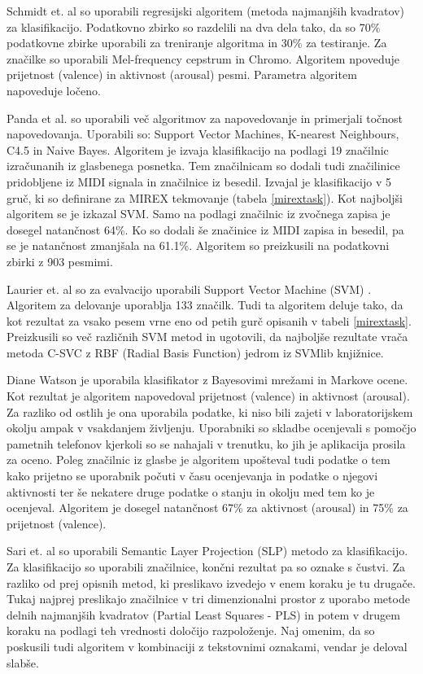 \documentclass[a4paper, 12pt]{book}
\begin{document}
{Schmidt et. al \cite{schmidt2009projection} so uporabili regresijski algoritem (metoda najmanjših kvadratov) za klasifikacijo. Podatkovno zbirko so razdelili na dva dela tako, da so 70\% podatkovne zbirke uporabili za treniranje algoritma in 30\% za testiranje. Za značilke so uporabili Mel-frequency cepstrum in Chromo. Algoritem npoveduje prijetnost (valence) in aktivnost (arousal) pesmi. Parametra algoritem napoveduje ločeno. 

Panda et al. \cite{panda2013multi} so uporabili več algoritmov za napovedovanje in primerjali točnost napovedovanja. Uporabili so: Support Vector Machines, K-nearest Neighbours, C4.5 in Naive Bayes. Algoritem je izvaja klasifikacijo na podlagi 19 značilnic izračunanih iz glasbenega posnetka. Tem značilnicam so dodali tudi značilinice pridobljene iz MIDI signala in značilnice iz besedil. Izvajal je klasifikacijo v 5 gruč, ki so definirane za MIREX tekmovanje (tabela \ref{mirextask}).  Kot najboljši algoritem se je izkazal SVM. Samo na podlagi značilnic iz zvočnega zapisa je dosegel natančnost 64\%. Ko so dodali še značinice iz MIDI zapisa in besedil, pa se je natančnost zmanjšala na 61.1\%. Algoritem so preizkusili na podatkovni zbirki z 903 pesmimi. 

Laurier et. al \cite{laurier2007audio} so za evalvacijo uporabili Support Vector Machine (SVM) \cite{ben2010user}. Algoritem za delovanje uporablja 133 značilk. Tudi ta algoritem deluje tako, da kot rezultat za vsako pesem vrne eno od petih gurč opisanih v tabeli \ref{mirextask}. Preizkusili so več različnih SVM metod in ugotovili, da najboljše rezultate vrača metoda C-SVC z RBF (Radial Basis Function) jedrom iz SVMlib knjižnice. 

Diane Watson \cite{watson2012modeling} je uporabila klasifikator z Bayesovimi mrežami in Markove ocene. Kot rezultat je algoritem napovedoval prijetnost (valence) in aktivnost (arousal). Za razliko od ostlih je ona uporabila podatke, ki niso bili zajeti v laboratorijskem okolju ampak v vsakdanjem življenju. Uporabniki so skladbe ocenjevali s pomočjo pametnih telefonov kjerkoli so se nahajali v trenutku, ko jih je aplikacija prosila za oceno. Poleg značilnic iz glasbe je algoritem upošteval tudi podatke o tem kako prijetno se uporabnik počuti v času ocenjevanja in podatke o njegovi aktivnosti ter še nekatere druge podatke o stanju in okolju med tem ko je ocenjeval. Algoritem je dosegel natančnost 67\% za aktivnost (arousal) in 75\% za prijetnost (valence). 

Sari et. al \cite{saari2013role} so uporabili Semantic Layer Projection (SLP) metodo za klasifikacijo. Za klasifikacijo so uporabili značilnice, končni rezultat pa so oznake s čustvi. Za razliko od prej opisnih metod, ki preslikavo izvedejo v enem koraku je tu drugače. Tukaj najprej preslikajo značilnice v tri dimenzionalni prostor z uporabo metode delnih najmanjših kvadratov (Partial Least Squares - PLS) in potem v drugem koraku na podlagi teh vrednosti določijo razpoloženje. Naj omenim, da so poskusili tudi algoritem v kombinaciji z tekstovnimi oznakami, vendar je deloval slabše. 


}
\end{document}
